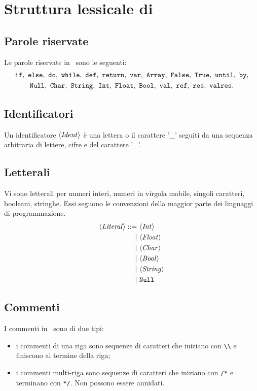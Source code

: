 \section{Struttura lessicale di \SBF}

\subsection*{Parole riservate}
Le parole riservate in \SBF\ sono le seguenti:
\begin{gather*}
\If,\ \Else,\ \Do,\ \While,\ \Def,\ \Return,\ \Var,\ \texttt{Array},\ \False,\ \True,\ \texttt{until},\ \texttt{by},\\
\texttt{Null},\ \texttt{Char},\ \texttt{String},\ \texttt{Int},\ \texttt{Float},\ \texttt{Bool},\ \texttt{val},\ \texttt{ref},\ \texttt{res},\ \texttt{valres}.
\end{gather*}

\subsection*{Identificatori}

Un identificatore $\langle \mathit{Ident} \rangle$ è una lettera o il carattere '\_' seguiti da una sequenza arbitraria di lettere, cifre e del carattere '\_'.

\subsection*{Letterali}
Vi sono letterali per numeri interi, numeri in virgola mobile, singoli caratteri, booleani, stringhe. Essi seguono le convenzioni della maggior parte dei linguaggi di programmazione.
\begin{align*}
\token{Literal} ::=\ 
& \token{Int}\\
|\ & \token{Float}\\
|\ & \token{Char}\\
|\ & \token{Bool}\\
|\ & \token{String}\\
|\ & \texttt{Null}
\end{align*}

\subsection*{Commenti}
I commenti in \SBF\ sono di due tipi:
\begin{itemize}
	\item i commenti di una riga sono sequenze di caratteri che iniziano con \verb$\\$ e finiscono al termine della riga;
	\item i commenti multi-riga sono sequenze di caratteri che iniziano con \verb$/*$ e terminano con \verb$*/$. Non possono essere annidati.
\end{itemize}

